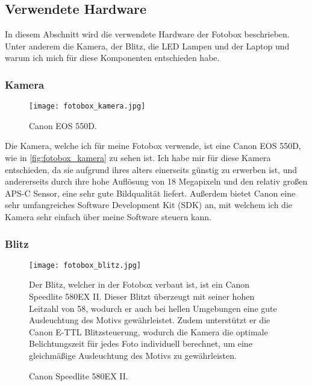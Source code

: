 \newpage

\subsection{Verwendete Hardware}

In diesem Abschnitt wird die verwendete Hardware der Fotobox beschrieben.
Unter anderem die Kamera, der Blitz, die LED Lampen und der Laptop und warum
ich mich für diese Komponenten entschieden habe.

\subsubsection{Kamera}

\begin{figure}[H]
    \centering
    \texttt{[image: fotobox\_kamera.jpg]}
    \caption{Canon EOS 550D.}
    \label{fig:fotobox_kamera}
\end{figure}

Die Kamera, welche ich für meine Fotobox verwende, ist eine Canon EOS 550D,
wie in \autoref{fig:fotobox_kamera} zu sehen ist. Ich habe mir für diese
Kamera entschieden, da sie aufgrund ihres alters einerseits günstig zu
erwerben ist, und andererseits durch ihre hohe Auflösung von 18 Megapixeln und 
den relativ großen APS-C Sensor, eine sehr gute Bildqualität liefert.
Außerdem bietet Canon eine sehr umfangreiches Software Development Kit (SDK) an,
mit welchem ich die Kamera sehr einfach über meine Software steuern kann.

\subsubsection{Blitz}

\begin{figure}[H]
    \centering
    \begin{minipage}{0.5\textwidth}
        \texttt{[image: fotobox\_blitz.jpg]}
        \caption{Canon Speedlite 580EX II.}
        \label{fig:fotobox_blitz}
    \end{minipage}    
    \hfill
    \begin{minipage}{0.4\textwidth}
        \small
        Der Blitz, welcher in der Fotobox verbaut ist, ist ein
        Canon Speedlite 580EX II. Dieser Blitzt überzeugt mit seiner hohen
        Leitzahl von 58, wodurch er auch bei hellen Umgebungen
        eine gute Ausleuchtung des Motivs gewährleistet. Zudem unterstützt
        er die Canon E-TTL Blitzsteuerung, wodurch die Kamera die optimale
        Belichtungszeit für jedes Foto individuell berechnet, um eine 
        gleichmäßige Ausleuchtung des Motivs zu gewährleisten.
    \end{minipage}
\end{figure}

